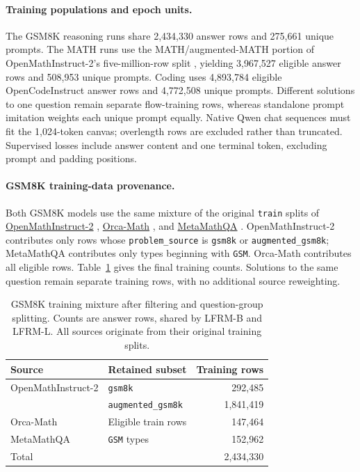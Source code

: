 \documentclass{article}
\begin{document}
\paragraph{Training populations and epoch units.}
The GSM8K reasoning runs share 2,434,330 answer rows and 275,661 unique prompts. The MATH runs use the MATH/augmented-MATH portion of OpenMathInstruct-2's five-million-row split \citep{openmath}, yielding 3,967,527 eligible answer rows and 508,953 unique prompts. Coding uses 4,893,784 eligible OpenCodeInstruct answer rows and 4,772,508 unique prompts. Different solutions to one question remain separate flow-training rows, whereas standalone prompt imitation weights each unique prompt equally. Native Qwen chat sequences must fit the 1,024-token canvas; overlength rows are excluded rather than truncated. Supervised losses include answer content and one terminal token, excluding prompt and padding positions.

\paragraph{GSM8K training-data provenance.}
Both GSM8K models use the same mixture of the original \texttt{train} splits of \href{https://huggingface.co/datasets/nvidia/OpenMathInstruct-2}{OpenMathInstruct-2} \citep{openmath}, \href{https://huggingface.co/datasets/microsoft/orca-math-word-problems-200k}{Orca-Math} \citep{orcamath}, and \href{https://huggingface.co/datasets/meta-math/MetaMathQA}{MetaMathQA} \citep{metamath}. OpenMathInstruct-2 contributes only rows whose \texttt{problem\_source} is \texttt{gsm8k} or \texttt{augmented\_gsm8k}; MetaMathQA contributes only types beginning with \texttt{GSM}. Orca-Math contributes all eligible rows. Table~\ref{tab:gsmtrainingmixture} gives the final training counts. Solutions to the same question remain separate training rows, with no additional source reweighting.

\begin{table}[!htb]
\centering\small
\setlength{\tabcolsep}{6pt}
\caption{GSM8K training mixture after filtering and question-group splitting. Counts are answer rows, shared by LFRM-B and LFRM-L. All sources originate from their original training splits.}
\label{tab:gsmtrainingmixture}
\begin{tabular}{@{}llr@{}}
\toprule
Source & Retained subset & Training rows\\
\midrule
OpenMathInstruct-2 & \texttt{gsm8k} & 292,485\\
 & \texttt{augmented\_gsm8k} & 1,841,419\\
Orca-Math & Eligible train rows & 147,464\\
MetaMathQA & \texttt{GSM} types & 152,962\\
\midrule
Total & & 2,434,330\\
\bottomrule
\end{tabular}
\end{table}
\end{document}
